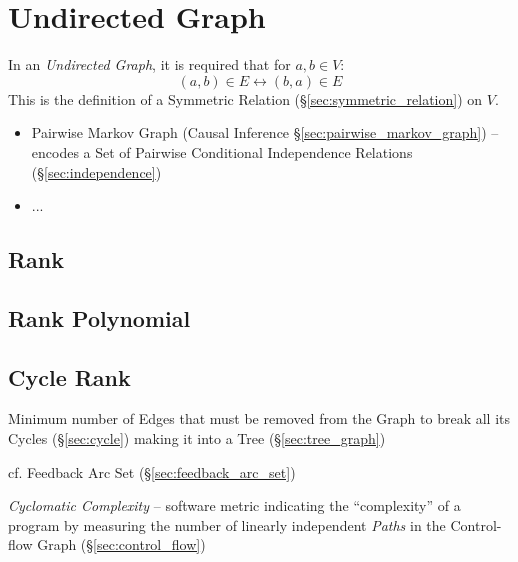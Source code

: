 \section{Undirected Graph}\label{sec:undirected_graph}

In an \emph{Undirected Graph}, it is required that for $a,b \in V$:
\[
    (a,b) \in E \leftrightarrow (b,a) \in E
\]
This is the definition of a Symmetric Relation
(\S\ref{sec:symmetric_relation}) on $V$.

\begin{itemize}
  \item Pairwise Markov Graph (Causal Inference
    \S\ref{sec:pairwise_markov_graph}) -- encodes a Set of Pairwise Conditional
    Independence Relations (\S\ref{sec:independence})
  \item ...
\end{itemize}



\subsection{Rank}\label{sec:rank}

\subsection{Rank Polynomial}\label{sec:rank_polynomial}



\subsection{Cycle Rank}\label{sec:cycle_rank}

Minimum number of Edges that must be removed from the Graph to break all its
Cycles (\S\ref{sec:cycle}) making it into a Tree (\S\ref{sec:tree_graph})

\fist cf. Feedback Arc Set (\S\ref{sec:feedback_arc_set})

\emph{Cyclomatic Complexity} -- software metric indicating the ``complexity''
of a program by measuring the number of linearly independent \emph{Paths} in
the Control-flow Graph (\S\ref{sec:control_flow})



